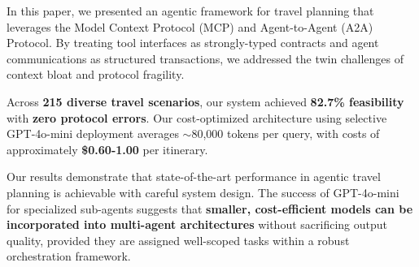 \documentclass[conference]{IEEEtran}
\begin{document}
In this paper, we presented an agentic framework for travel planning that leverages the Model Context Protocol (MCP) and Agent-to-Agent (A2A) Protocol. By treating tool interfaces as strongly-typed contracts and agent communications as structured transactions, we addressed the twin challenges of context bloat and protocol fragility.

Across \textbf{215 diverse travel scenarios}, our system achieved \textbf{82.7\% feasibility} with \textbf{zero protocol errors}. Our cost-optimized architecture using selective GPT-4o-mini deployment averages $\sim$80,000 tokens per query, with costs of approximately \textbf{\$0.60-1.00} per itinerary.

Our results demonstrate that state-of-the-art performance in agentic travel planning is achievable with careful system design. The success of GPT-4o-mini for specialized sub-agents suggests that \textbf{smaller, cost-efficient models can be incorporated into multi-agent architectures} without sacrificing output quality, provided they are assigned well-scoped tasks within a robust orchestration framework.

\balance
{\small


}
\end{document}
